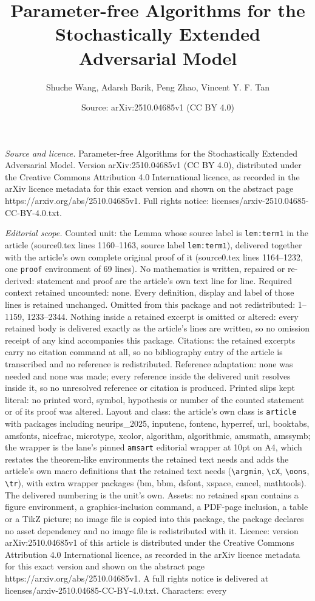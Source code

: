 \documentclass[10pt,a4paper]{amsart}
\title[Parameter-free Algorithms for the Stochastically Extended Ad]{Parameter-free Algorithms for the Stochastically Extended Adversarial Model}
\author{Shuche Wang, Adarsh Barik, Peng Zhao, Vincent Y. F. Tan}
\date{Source: arXiv:2510.04685v1 (CC BY 4.0)}
\begin{document}
\maketitle

\noindent\emph{Source and licence.} Parameter-free Algorithms for the Stochastically Extended Adversarial Model. Version arXiv:2510.04685v1 (CC BY 4.0), distributed under the Creative Commons Attribution 4.0 International licence, as recorded in the arXiv licence metadata for this exact version and shown on the abstract page https://arxiv.org/abs/2510.04685v1. Full rights notice: licenses/arxiv-2510.04685-CC-BY-4.0.txt.\par\smallskip

\noindent\textit{Editorial scope.} Counted unit: the Lemma whose source label is \texttt{lem:term1} in the article (source0.tex lines 1160--1163, source label \texttt{lem:term1}), delivered together with the article's own complete original proof of it (source0.tex lines 1164--1232, one \texttt{proof} environment of 69 lines). No mathematics is written, repaired or re-derived: statement and proof are the article's own text line for line. Required context retained uncounted: none. Every definition, display and label of those lines is retained unchanged. Omitted from this package and not redistributed: 1--1159, 1233--2344. Nothing inside a retained excerpt is omitted or altered: every retained body is delivered exactly as the article's lines are written, so no omission receipt of any kind accompanies this package. Citations: the retained excerpts carry no citation command at all, so no bibliography entry of the article is transcribed and no reference is redistributed. Reference adaptation: none was needed and none was made; every reference inside the delivered unit resolves inside it, so no unresolved reference or citation is produced. Printed slips kept literal: no printed word, symbol, hypothesis or number of the counted statement or of its proof was altered. Layout and class: the article's own class is \texttt{article} with packages including neurips\_2025, inputenc, fontenc, hyperref, url, booktabs, amsfonts, nicefrac, microtype, xcolor, algorithm, algorithmic, amsmath, amssymb; the wrapper is the lane's pinned \texttt{amsart} editorial wrapper at 10pt on A4, which restates the theorem-like environments the retained text needs and adds the article's own macro definitions that the retained text needs (\texttt{\textbackslash argmin}, \texttt{\textbackslash cX}, \texttt{\textbackslash oons}, \texttt{\textbackslash tr}), with extra wrapper packages (bm, bbm, dsfont, xspace, cancel, mathtools). The delivered numbering is the unit's own. Assets: no retained span contains a figure environment, a graphics-inclusion command, a PDF-page inclusion, a table or a TikZ picture; no image file is copied into this package, the package declares no asset dependency and no image file is redistributed with it. Licence: version arXiv:2510.04685v1 of this article is distributed under the Creative Commons Attribution 4.0 International licence, as recorded in the arXiv licence metadata for this exact version and shown on the abstract page https://arxiv.org/abs/2510.04685v1. A full rights notice is delivered at licenses/arxiv-2510.04685-CC-BY-4.0.txt. Characters: every 
\end{document}
